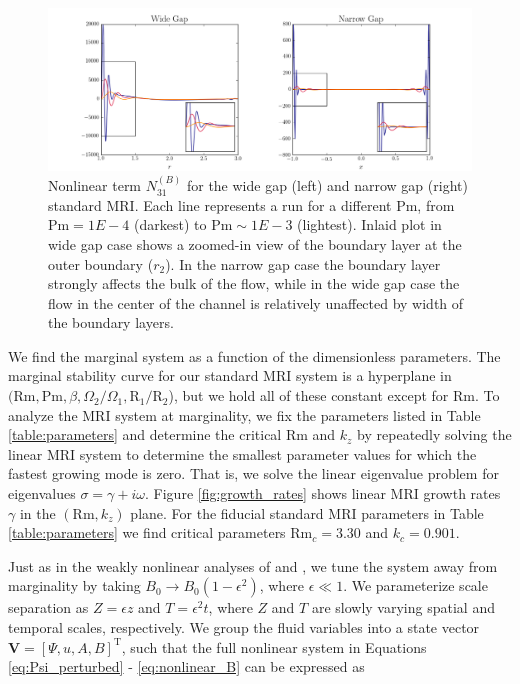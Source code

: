 \documentclass{emulateapj}
\newcommand{\citei}[1]{\citeauthor{#1} \citeyear{#1}}
\newcommand\reym{\mathrm{Rm}}
\newcommand{\Pm}{\mathrm{Pm}}
\begin{document}
\begin{figure}
\centering
\includegraphics[width=\textwidth]{../figures/widegap_narrowgap_comparison_narrowfiducial.png}
\caption{Nonlinear term $N_{31}^{(B)}$ for the wide gap (left) and narrow gap (right) standard MRI. Each line represents a run for a different $\Pm$, from $\Pm = 1E-4$ (darkest) to $\Pm \sim 1E-3$ (lightest). Inlaid plot in wide gap case shows a zoomed-in view of the boundary layer at the outer boundary ($r_2$). In the narrow gap case the boundary layer strongly affects the bulk of the flow, while in the wide gap case the flow in the center of the channel is relatively unaffected by width of the boundary layers.}\label{fig:wide_narrow_N31B}
\end{figure}

We find the marginal system as a function of the dimensionless parameters. The marginal stability curve for our standard MRI system is a hyperplane in $(\reym, \Pm, \beta, \Omega_2/\Omega_1, \mathrm{R}_1/\mathrm{R}_2$), but we hold all of these constant except for $\reym$. To analyze the MRI system at marginality, we fix the parameters listed in Table \ref{table:parameters} and determine the critical $\reym$ and $k_z$ by repeatedly solving the linear MRI system to determine the smallest parameter values for which the fastest growing mode is zero. That is, we solve the linear eigenvalue problem for eigenvalues $\sigma = \gamma + i \omega$. Figure \ref{fig:growth_rates} shows linear MRI growth rates $\gamma$ in the $(\reym, k_z)$ plane. For the fiducial standard MRI parameters in Table \ref{table:parameters} we find critical parameters $\reym_c = 3.30$ and $k_c = 0.901$.

Just as in the weakly nonlinear analyses of \citei{Umurhan:2007hs} and \citei{Clark:2016}, we tune the system away from marginality by taking $B_0 \rightarrow B_0\left(1 - \epsilon^2\right)$, where $\epsilon \ll 1$. We parameterize scale separation as $Z = \epsilon z$ and $T = \epsilon^2 t$, where $Z$ and $T$ are slowly varying spatial and temporal scales, respectively. We group the fluid variables into a state vector $\mathbf{V} = \left[\Psi, u, A, B\right]^{\mathrm{T}}$, such that the full nonlinear system in Equations \ref{eq:Psi_perturbed} - \ref{eq:nonlinear_B} can be expressed as
\end{document}
